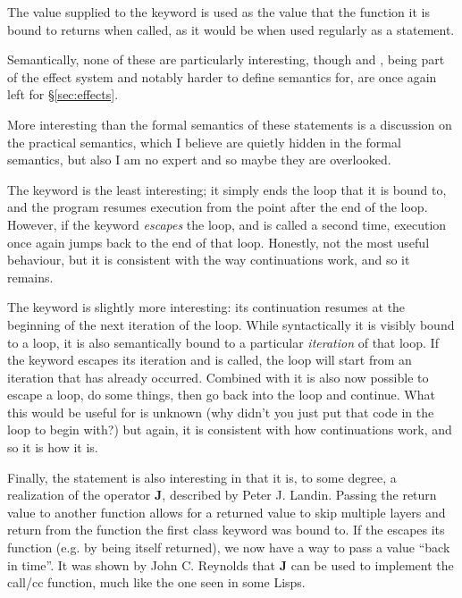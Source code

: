 The value supplied to the  keyword is used as the value that the function
it is bound to returns when called, as it would be when used regularly as a statement.

Semantically, none of these are particularly interesting, though  and , being
part of the effect system and notably harder to define semantics for, are once again
left for \S\ref{sec:effects}.

\begin{prooftree}
\end{prooftree}

\begin{prooftree}
\end{prooftree}

\begin{prooftree}
\end{prooftree}

More interesting than the formal semantics of these statements is a discussion on
the practical semantics, which I believe are quietly hidden in the formal semantics,
but also I am no expert and so maybe they are overlooked.

The  keyword is the least interesting; it simply ends the loop that it
is bound to, and the program resumes execution from the point after the end of the
loop. However, if the  keyword \emph{escapes} the loop, and is called
a second time, execution once again jumps back to the end of that loop. Honestly, not
the most useful behaviour, but it is consistent with the way continuations work, and
so it remains.

The  keyword is slightly more interesting: its continuation resumes
at the beginning of the next iteration of the loop. While syntactically it is visibly
bound to a loop, it is also semantically bound to a particular \emph{iteration} of
that loop. If the  keyword escapes its iteration and is called,
the loop will start from an iteration that has already occurred. Combined with
 it is also now possible to escape a loop, do some things, then go back
into the loop and continue. What this would be useful for is unknown (why didn't
you just put that code in the loop to begin with?) but again, it is consistent with
how continuations work, and so it is how it is.

Finally, the  statement is also interesting in that it is, to some degree,
a realization of the operator \textbf{J}, described by Peter J. Landin\cite{j}.
Passing the return value to another function allows for a returned value to skip
multiple layers and return from the function the first class keyword was bound to.
If the  escapes its function (e.g. by being itself returned), we now have
a way to pass a value ``back in time''. It was shown by John C. Reynolds that \textbf{J}
can be used to implement the call/cc function, much like the one seen in some Lisps\cite{defint}.
